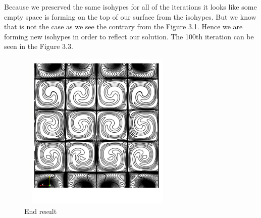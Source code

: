 \documentclass{report}
\begin{document}
\pagebreak
Because we preserved the same isohypes for all of the iterations it looks like some empty space is forming on the top of our surface from the isohypes. But we know that is not the case as we see the contrary from the Figure 3.1. Hence we are forming new isohypes in order to reflect our solution. The 100th iteration can be seen in the Figure 3.3.
\begin{figure}
    \centering
    \includegraphics[height=3in,width=3in,angle=0]{countours/countour_100.pdf}
    \caption{End result}
\end{figure}
\end{document}
